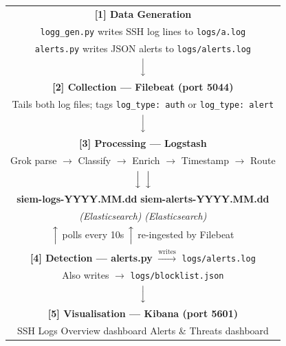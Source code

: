 \documentclass[12pt,a4paper]{article}
\newcommand{\file}[1]{\texttt{\color{accent}#1}}
\newcommand{\field}[1]{\texttt{#1}}
\begin{document}
\begin{center}
\begin{tcolorbox}[colback=lightblue,colframe=accent,width=\linewidth,
  title={\textbf{End-to-End Data Flow}},fonttitle=\bfseries]
\small\centering
\begin{tabular}{c}
  \textbf{[1] Data Generation} \\
  \file{logg\_gen.py} writes SSH log lines to \file{logs/a.log} \\
  \file{alerts.py} writes JSON alerts to \file{logs/alerts.log} \\[0.5em]
  $\Big\downarrow$ \\[0.3em]
  \textbf{[2] Collection — Filebeat (port 5044)} \\
  Tails both log files; tags \field{log\_type: auth} or \field{log\_type: alert} \\[0.5em]
  $\Big\downarrow$ \\[0.3em]
  \textbf{[3] Processing — Logstash} \\
  Grok parse $\rightarrow$ Classify $\rightarrow$ Enrich $\rightarrow$ Timestamp $\rightarrow$ Route \\[0.5em]
  $\Big\downarrow$ \hspace{4cm} $\Big\downarrow$ \\[0.2em]
  \textbf{siem-logs-YYYY.MM.dd} \hspace{2cm} \textbf{siem-alerts-YYYY.MM.dd} \\
  \textit{(Elasticsearch)} \hspace{3.2cm} \textit{(Elasticsearch)} \\[0.5em]
  $\Big\uparrow$ polls every 10s \hspace{2.5cm} $\Big\uparrow$ re-ingested by Filebeat \\[0.2em]
  \textbf{[4] Detection — alerts.py} $\xrightarrow{\text{writes}}$ \file{logs/alerts.log} \\
  Also writes $\rightarrow$ \file{logs/blocklist.json} \\[0.5em]
  $\Big\downarrow$ \\[0.3em]
  \textbf{[5] Visualisation — Kibana (port 5601)} \\
  SSH Logs Overview dashboard \quad Alerts \& Threats dashboard \\
\end{tabular}
\end{tcolorbox}
\end{center}
\end{document}
